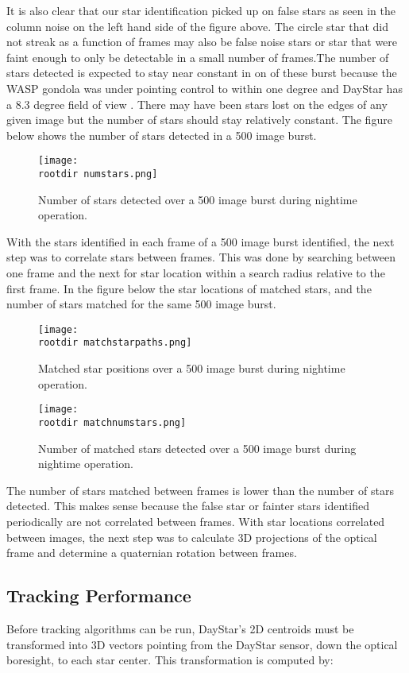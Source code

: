 \documentclass[twocolumn,letterpaper]{IEEEAerospace2012}
\newcommand{\rootdir}{./Figures/}
\begin{document}
It is also clear that our star identification picked up on false stars as seen in the column noise on the left hand side of the figure above. The circle star that did not streak as a function of frames may also be false noise stars or star that were faint enough to only be detectable in a small number of frames.The number of stars detected is expected to stay near constant in on of these burst because the WASP gondola was under pointing control to within one degree and DayStar has a 8.3 degree field of view . There may have been stars lost on the edges of any given image but the number of stars should stay relatively constant. The figure below shows the number of stars detected in a 500 image burst.
\begin{figure}
    \centering
    \texttt{[image: \\rootdir numstars.png]}
    \caption{Number of stars detected over a 500 image burst during nightime operation.}
    \label{fig:numstars}
\end{figure}

With the stars identified in each frame of a 500 image burst identified, the next step was to correlate stars between frames. This was done by searching between one frame and the next for star location within a search radius relative to the first frame. In the figure below the star locations of matched stars, and the number of stars matched for the same 500 image burst.  
\begin{figure}
    \centering
    \texttt{[image: \\rootdir matchstarpaths.png]}
    \caption{Matched star positions over a 500 image burst during nightime operation.}
    \label{fig:matchstarpaths}
\end{figure}
\begin{figure}
    \centering
    \texttt{[image: \\rootdir matchnumstars.png]}
    \caption{Number of matched stars detected over a 500 image burst during nightime operation.}
    \label{fig:matchnumstars}
\end{figure}

The number of stars matched between frames is lower than the number of stars detected. This makes sense because the false star or fainter stars identified periodically are not correlated between frames. With star locations correlated between images, the next step was to calculate 3D projections of the optical frame and determine a quaternian rotation between frames.   

\subsection{Tracking Performance}
Before tracking algorithms can be run, DayStar's 2D centroids must be transformed into 3D vectors pointing from the DayStar sensor, down the optical boresight, to each star center. This transformation is computed by:
\end{document}
